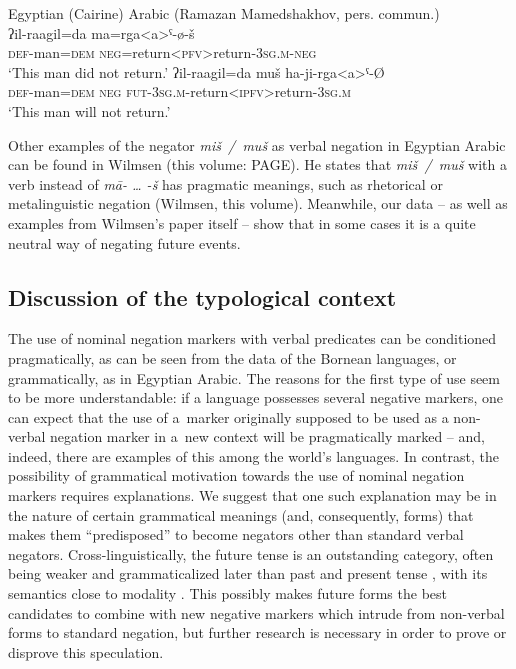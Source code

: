 \documentclass[output=paper]{langsci/langscibook}
\begin{document}
\ea Egyptian (Cairine) Arabic (Ramazan Mamedshakhov, pers. commun.) \label{ex:BK68}\\
  \ea
	\gll ʔil-raagil=da	ma=rga<a>ˤ-ø-š\\
	\textsc{def}-man=\textsc{dem}	\textsc{neg}=return<\textsc{pfv}>return-\textsc{3sg.m-neg}\\
	\glt `This man did not return.'
  \ex
	\gll ʔil-raagil=da	muš	ha-ji-rga<a>ˤ-Ø\\
	\textsc{def}-man=\textsc{dem}	\textsc{neg}	\textsc{fut-3sg.m}-return<\textsc{ipfv}>return-\textsc{3sg.m}\\
	\glt `This man will not return.'
\z \z

Other examples of the negator \textit{miš / muš} as verbal negation in Egyptian Arabic can be found in Wilmsen (this volume: PAGE). He states that \textit{miš / muš} with a verb instead of \textit{mā- … -š} has pragmatic meanings, such as rhetorical or metalinguistic negation (Wilmsen, this volume). Meanwhile, our data – as well as examples from Wilmsen’s paper itself – show that in some cases it is a quite neutral way of negating future events.

\subsection{Discussion of the typological context}\label{sec:BK4.4}

The use of nominal negation markers with verbal predicates can be conditioned pragmatically, as can be seen from the data of the Bornean languages, or grammatically, as in Egyptian Arabic. The reasons for the first type of use seem to be more understandable: if a language possesses several negative markers, one can expect that the use of a marker originally supposed to be used as a non-verbal negation marker in a new context will be pragmatically marked – and, indeed, there are examples of this among the world’s languages. In contrast, the possibility of grammatical motivation towards the use of nominal negation markers requires explanations. We suggest that one such explanation may be in the nature of certain grammatical meanings (and, consequently, forms) that makes them “predisposed” to become negators other than standard verbal negators. Cross-linguistically, the future tense is an outstanding category, often being weaker and grammaticalized later than past and present tense \citep[771]{lindstedt2001a}, with its semantics close to modality \citep[280]{BybeePerkins1994}. This possibly makes future forms the best candidates to combine with new negative markers which intrude from non-verbal forms to standard negation, but further research is necessary in order to prove or disprove this speculation.
\end{document}

